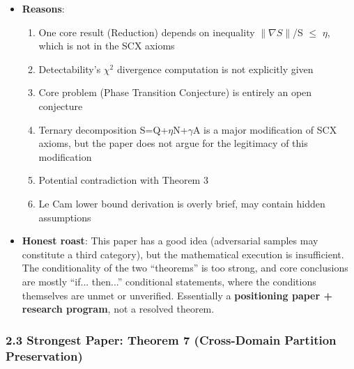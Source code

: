 \documentclass[
  12pt,
]{article}
\providecommand{\tightlist}{%
  \setlength{\itemsep}{0pt}\setlength{\parskip}{0pt}}
\begin{document}
\begin{itemize}
\tightlist
\item
  \textbf{Reasons}:

  \begin{enumerate}
  \def\labelenumi{\arabic{enumi}.}
  \tightlist
  \item
    One core result (Reduction) depends on inequality $\|\nabla S\|$/S $\leq$ $\eta$, which is not in the SCX axioms
  \item
    Detectability's $\chi^2$ divergence computation is not explicitly given
  \item
    Core problem (Phase Transition Conjecture) is entirely an open conjecture
  \item
    Ternary decomposition S=Q+$\eta$N+$\gamma$A is a major modification of SCX axioms, but the paper does not argue for the legitimacy of this modification
  \item
    Potential contradiction with Theorem 3
  \item
    Le Cam lower bound derivation is overly brief, may contain hidden assumptions
  \end{enumerate}
\item
  \textbf{Honest roast}: This paper has a good idea (adversarial samples may constitute a third category), but the mathematical execution is insufficient. The conditionality of the two ``theorems'' is too strong, and core conclusions are mostly ``if... then...'' conditional statements, where the conditions themselves are unmet or unverified. Essentially a \textbf{positioning paper + research program}, not a resolved theorem.
\end{itemize}

\subsubsection{2.3 Strongest Paper: \textbf{Theorem 7 (Cross-Domain Partition Preservation)}}\label{strongest-paper}
\end{document}
